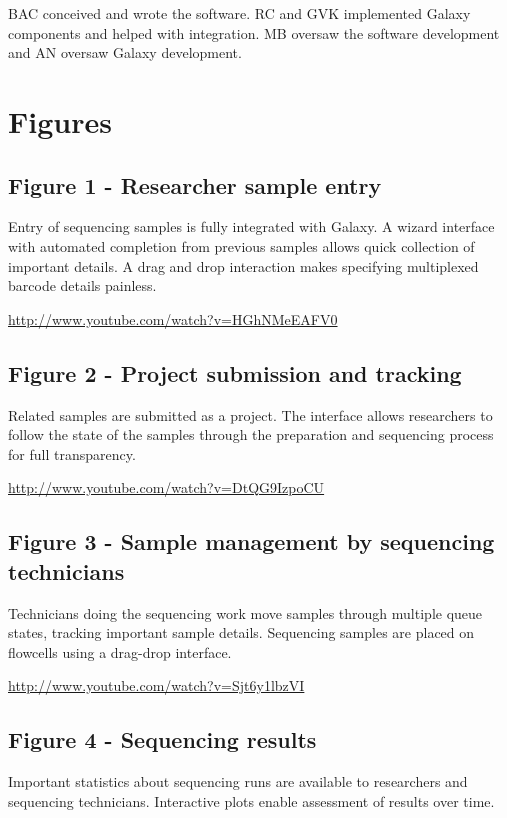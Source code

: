 \documentclass[10pt]{bmc_article}
\newenvironment{bmcformat}{\begin{raggedright}\baselineskip20pt\sloppy\setboolean{publ}{false}}{\end{raggedright}\baselineskip20pt\sloppy}
\begin{document}
\begin{bmcformat}
BAC conceived and wrote the software. RC and GVK implemented
Galaxy components and helped with integration. MB oversaw the software
development and AN oversaw Galaxy development.


{
   }  %


\section*{Figures}
\subsection*{Figure 1 - Researcher sample entry}
Entry of sequencing samples is fully integrated with Galaxy. A
wizard interface with automated completion from previous samples
allows quick collection of important details. A drag and drop
interaction makes specifying multiplexed barcode details painless.

\url{http://www.youtube.com/watch?v=HGhNMeEAFV0}

\subsection*{Figure 2 - Project submission and tracking}
Related samples are submitted as a project. The interface allows
researchers to follow the state of the samples through the
preparation and sequencing process for full transparency.

\url{http://www.youtube.com/watch?v=DtQG9IzpoCU}

\subsection*{Figure 3 - Sample management by sequencing technicians}
Technicians doing the sequencing work move samples through multiple
queue states, tracking important sample details. Sequencing samples
are placed on flowcells using a drag-drop interface.

\url{http://www.youtube.com/watch?v=Sjt6y1lbzVI}

\subsection*{Figure 4 - Sequencing results}
Important statistics about sequencing runs are available to
researchers and sequencing technicians. Interactive plots enable
assessment of results over time.


\end{bmcformat}
\end{document}
